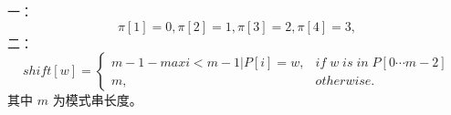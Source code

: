 \documentclass{article}
\begin{document}
一：\\
\[
\pi[1] = 0,
\pi[2] = 1,
\pi[3] = 2,
\pi[4] = 3,
\]
二：\\
\[
shift[w] =
\begin{cases}
    m - 1 - max{i < m - 1 | P[i] = w},& if\; w\; is\; in\; P[0 \cdots m - 2]\\
    m,& otherwise.
\end{cases} 
\]
其中 $m$ 为模式串长度。
\end{document}
